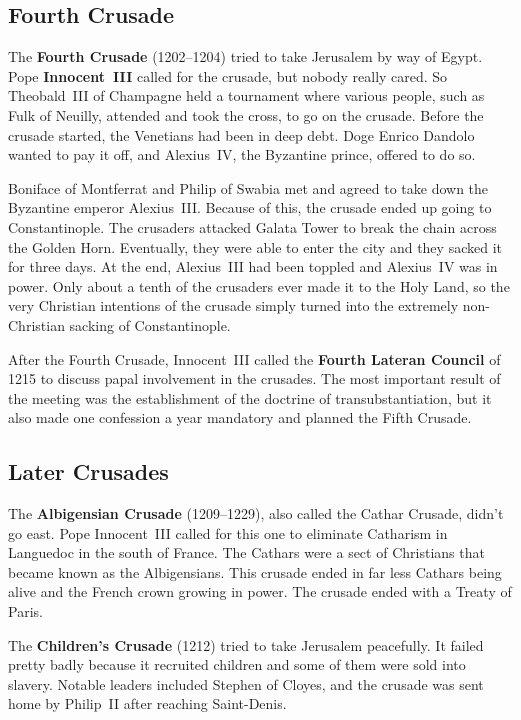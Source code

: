\subsection*{Fourth Crusade}

The \textbf{Fourth Crusade} (1202--1204) tried to take Jerusalem by way of Egypt.
Pope \textbf{Innocent~III} called for the crusade, but nobody really cared.
So Theobald~III of Champagne held a tournament where various people, such as Fulk of Neuilly,
attended and took the cross, to go on the crusade.
Before the crusade started, the Venetians had been in deep debt.
Doge Enrico Dandolo wanted to pay it off, and Alexius~IV, the Byzantine prince, offered to do so.

Boniface of Montferrat and Philip of Swabia met and agreed to take down the Byzantine emperor Alexius~III\@.
Because of this, the crusade ended up going to Constantinople.
The crusaders attacked Galata Tower to break the chain across the Golden Horn.
Eventually, they were able to enter the city and they sacked it for three days.
At the end, Alexius~III had been toppled and Alexius~IV was in power.
Only about a tenth of the crusaders ever made it to the Holy Land,
so the very Christian intentions of the crusade simply turned into
the extremely non-Christian sacking of Constantinople.

After the Fourth Crusade,
Innocent~III called the \textbf{Fourth Lateran Council} of 1215 to discuss papal involvement in the crusades.
The most important result of the meeting was the establishment of the doctrine of transubstantiation,
but it also made one confession a year mandatory and planned the Fifth Crusade.

\subsection*{Later Crusades}

The \textbf{Albigensian Crusade} (1209--1229), also called the Cathar Crusade, didn't go east.
Pope Innocent~III called for this one to eliminate Catharism in Languedoc in the south of France.
The Cathars were a sect of Christians that became known as the Albigensians.
This crusade ended in far less Cathars being alive and the French crown growing in power.
The crusade ended with a Treaty of Paris.

The \textbf{Children's Crusade} (1212) tried to take Jerusalem peacefully.
It failed pretty badly because it recruited children and some of them were sold into slavery.
Notable leaders included Stephen of Cloyes, and the crusade was sent home by Philip~II after reaching Saint-Denis.

